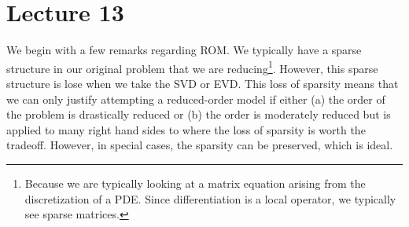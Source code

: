 \chapter{Lecture 13}
We begin with a few remarks regarding ROM. We typically have a sparse structure in our original problem that we are reducing\footnote{Because we are typically looking at a matrix equation arising from the discretization of a PDE. Since differentiation is a local operator, we typically see sparse matrices.}. However, this sparse structure is lose when we take the SVD or EVD. This loss of sparsity means that we can only justify attempting a reduced-order model if either (a) the order of the problem is drastically reduced or (b) the order is moderately reduced but is applied to many right hand sides to where the loss of sparsity is worth the tradeoff. However, in special cases, the sparsity can be preserved, which is ideal.

